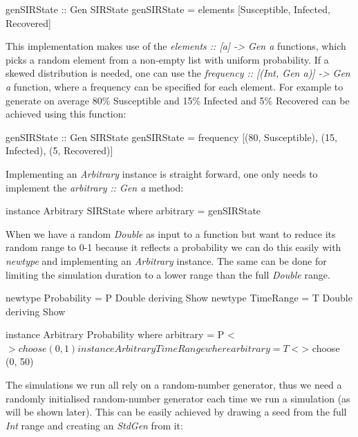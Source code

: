 \begin{HaskellCode}
genSIRState :: Gen SIRState
genSIRState = elements [Susceptible, Infected, Recovered]
\end{HaskellCode}

This implementation makes use of the \textit{elements :: [a] -> Gen a} functions, which picks a random element from a non-empty list with uniform probability. If a skewed distribution is needed, one can use the \textit{frequency :: [(Int, Gen a)] -> Gen a} function, where a frequency can be specified for each element. For example to generate on average 80\% Susceptible and 15\% Infected and  5\% Recovered can be achieved using this function:

\begin{HaskellCode}
genSIRState :: Gen SIRState
genSIRState = frequency [(80, Susceptible), (15, Infected), (5, Recovered)]
\end{HaskellCode}

Implementing an \textit{Arbitrary} instance is straight forward, one only needs to implement the \textit{arbitrary :: Gen a} method:

\begin{HaskellCode}
instance Arbitrary SIRState where
  arbitrary = genSIRState
\end{HaskellCode}

When we have a random \textit{Double} as input to a function but want to reduce its random range to 0-1 because it reflects a probability we can do this easily with \textit{newtype} and implementing an \textit{Arbitrary} instance. The same can be done for limiting the simulation duration to a lower range than the full \textit{Double} range.

\begin{HaskellCode}
newtype Probability = P Double deriving Show
newtype TimeRange   = T Double deriving Show

instance Arbitrary Probability where
  arbitrary = P <$> choose (0, 1)
  
instance Arbitrary TimeRange where
  arbitrary = T <$> choose (0, 50)
\end{HaskellCode}

The simulations we run all rely on a random-number generator, thus we need a randomly initialised random-number generator each time we run a simulation (as will be shown later). This can be easily achieved by drawing a seed from the full \textit{Int} range and creating an \textit{StdGen} from it:


